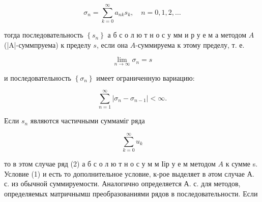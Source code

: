 \documentclass[10pt]{article}
\begin{document}
\[

\sigma_{n}=\sum_{k=0}^{\infty} a_{n k} s_{k}, \quad n=0,1,2, \ldots

\]



тогда последовательность $\left\{s_{n}\right\}$ а б с о л ю т н о с у мм и р у е м а методом $A$ (|A|-суммпруема) к пределу $s$, если она $A$-суммируема к этому пределу, т. е.



\[

\lim _{n \rightarrow \infty} \sigma_{n}=s

\]



и последовательность $\left\{\sigma_{n}\right\}$ имеет ограниченную вариацию:



\[

\sum_{n=1}^{\infty}\left|\sigma_{n}-\sigma_{n-1}\right|<\infty .

\]



Если $s_{n}$ являются частичными суммаміг ряда



\[

\sum_{k=0}^{\infty} u_{k}

\]



то в этом случае ряд (2) а б с о л ю т н о с у м м Іір у е м методом $A$ к сумме s. Условие (1) и есть то дополнительное условие, к-рое выделяет в әтом случае А. с. из обычной суммируемости. Аналогично определяется А. с. для методов, определяемых матричнымш преобразованиями рядов в последовательности. Если
\end{document}
